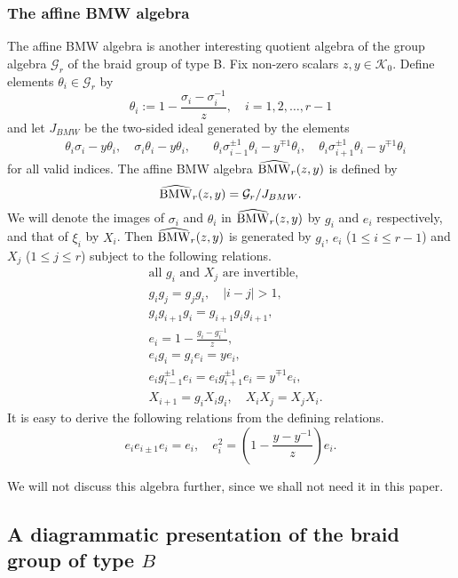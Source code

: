 \documentclass[12pt]{amsart}
\theoremstyle{definition}
\theoremstyle{remark}
\numberwithin{equation}{section}
\newcommand{\CG}{{\mathcal G}}
\newcommand{\CK}{{\mathcal K}}
\newcommand{\HBMW}{\widehat{\rm BMW}}
\begin{document}
\subsubsection{The affine BMW algebra}
%
%
The affine BMW algebra \cite{DRV} is another interesting quotient algebra of the group algebra $\CG_r$ of the braid group of type B. 
Fix non-zero scalars $z, y\in\CK_0$. Define elements $\theta_i\in\CG_r$ by 
\[
\theta_i:= 1-\frac{\sigma_i- \sigma_i^{-1}}{z}, \quad  i=1,2,\dots,r-1
\]
and let  $J_{BMW}$ be the two-sided ideal  generated by the elements 
\[
\begin{aligned}
&\theta_i \sigma_i - y \theta_i, \quad  \sigma_i \theta_i - y \theta_i, \quad
&\theta_i \sigma_{i-1}^{\pm 1} \theta_i - y^{\mp 1} \theta_i, \quad
\theta_i \sigma_{i+1}^{\pm 1} \theta_i - y^{\mp 1} \theta_i
\end{aligned}
\]
for all valid indices.  The affine BMW algebra $\HBMW_r(z, y)$ is defined by 
\[
\HBMW_r(z, y)= \CG_r/J_{BMW}.
\]
We will denote the images of 
$\sigma_i$ and $\theta_i$ in $\HBMW_r(z, y)$ by $g_i$ and $e_i$ respectively, 
and that of $\xi_i$ by $X_i$. Then $\HBMW_r(z, y)$ is generated by $g_i$, $e_i$ ($1\le i\le r-1$) and $X_j$ ($1\le j\le r$) subject to the following relations.
\begin{eqnarray*}%
&\text{all $g_i$ and $X_j$ are  invertible}, \\
&g_i g_j = g_j g_i,  \quad |i-j|>1, \\
&g_i g_{i+1} g_i = g_{i+1} g_i g_{i+1}, \\
&e_i= 1 - \frac{g_i - g_i^{-1}}{z}, \\
&e_i g_i = g_i e_i = y e_i, \\
&e_i g_{i-1}^{\pm 1} e_i = e_i g_{i+1}^{\pm 1} e_i =y^{\mp 1} e_i, \\
&X_{i+1}= g_i X_i g_i, \quad X_i X_j =X_j X_i.
\end{eqnarray*}
It is easy to derive the following relations from the defining relations.
\[
e_i e_{i\pm 1} e_i = e_i, \quad  e_i^2 = \left(1- \frac{y - y^{-1}}{z}\right)e_i.
\] 

We will not discuss this algebra further, since we shall not need it in this paper. 

%
%
%
%
%
%
%
\subsection{A diagrammatic presentation of the braid group of type $B$}\label{sect:diagrams}
%
%
\end{document}

